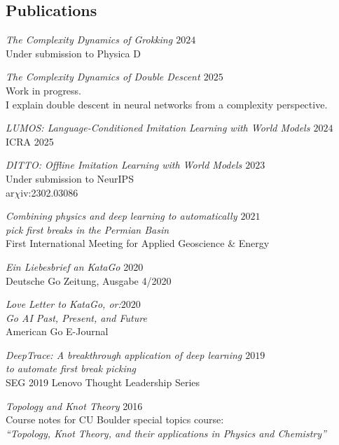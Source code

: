 \documentclass[margin]{res}
\begin{document}
\begin{resume}
                 \section{Publications}

                 {\sl The Complexity Dynamics of Grokking \hfill $2024$}\\
                 Under submission to Physica D

                 {\sl The Complexity Dynamics of Double Descent \hfill $2025$}\\
                 Work in progress.\\
                 I explain double descent in neural networks from a complexity perspective.

                 {\sl LUMOS: Language-Conditioned Imitation Learning with World Models \hfill $2024$}\\
                 ICRA 2025

                 {\sl DITTO: Offline Imitation Learning with World Models \hfill            $2023$}\\
                 Under submission to NeurIPS\\
                 ar$\chi$iv:2302.03086


                 {\sl Combining physics and deep learning to automatically \hfill            $2021$ \\ pick first breaks in the Permian Basin} \\
		First International Meeting for Applied Geoscience \& Energy

                {\sl Ein Liebesbrief an KataGo} \hfill 2020 \\
                Deutsche Go Zeitung, Ausgabe 4/2020

                {\sl Love Letter to KataGo, or:\hfill $2020$\\ Go AI Past, Present, and Future} \\
                American Go E-Journal

                {\sl DeepTrace: A breakthrough application of deep learning \hfill $2019$\\ to automate first break picking}  \\
                SEG 2019 Lenovo Thought Leadership Series

                {\sl Topology and Knot Theory} \hfill 2016 \\
                Course notes for CU Boulder special topics course: \\
                \textit{``Topology, Knot Theory, and their applications in Physics and Chemistry''}


\end{resume}
\end{document}
